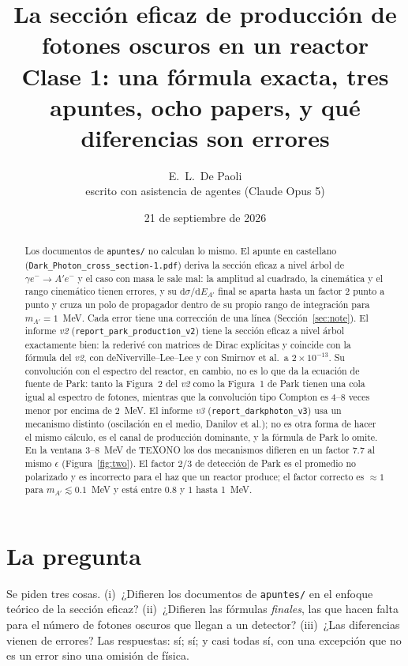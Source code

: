 \documentclass[11pt,a4paper]{article}
\title{La sección eficaz de producción de fotones oscuros en un reactor\\[2pt]
\large Clase 1: una fórmula exacta, tres apuntes, ocho papers, y qué diferencias son errores}
\author{E.~L.~De Paoli\\[2pt]\small escrito con asistencia de agentes (Claude Opus 5)}
\date{21 de septiembre de 2026}
\newcommand{\Ap}{A'}
\newcommand{\eps}{\epsilon}
\newcommand{\dd}{\mathrm{d}}
\begin{document}
\maketitle

\begin{abstract}
\noindent\sloppy
Los documentos de \texttt{apuntes/} no calculan lo mismo. El apunte en castellano
(\texttt{Dark\_Photon\_cross\_section-1.pdf}) deriva la sección eficaz a nivel árbol de $\gamma e^-\to \Ap e^-$ y el caso
con masa le sale mal: la amplitud al cuadrado, la cinemática y el rango cinemático tienen errores, y su
$\dd\sigma/\dd E_{\Ap}$ final se aparta hasta un factor 2 punto a punto y cruza un polo de propagador dentro de su propio
rango de integración para $m_{\Ap}=1$~MeV. Cada error tiene una corrección de una línea (Sección~\ref{sec:note}). El
informe \emph{v2} (\texttt{report\_park\_production\_v2}) tiene la sección eficaz a nivel árbol exactamente bien: la
rederivé con matrices de Dirac explícitas y coincide con la fórmula del \emph{v2}, con deNiverville--Lee--Lee y con
Smirnov et al.\ a $2\times10^{-13}$. Su convolución con el espectro del reactor, en cambio, no es lo que da la ecuación de
fuente de Park: tanto la Figura~2 del \emph{v2} como la Figura~1 de Park tienen una cola igual al espectro de fotones,
mientras que la convolución tipo Compton es 4--8 veces menor por encima de 2~MeV. El informe \emph{v3}
(\texttt{report\_darkphoton\_v3}) usa un mecanismo distinto (oscilación en el medio, Danilov et al.); no es otra forma de
hacer el mismo cálculo, es el canal de producción dominante, y la fórmula de Park lo omite. En la ventana 3--8~MeV de
TEXONO los dos mecanismos difieren en un factor $7.7$ al mismo $\eps$ (Figura~\ref{fig:two}). El factor $2/3$ de detección
de Park es el promedio no polarizado y es incorrecto para el haz que un reactor produce; el factor correcto es $\approx1$
para $m_{\Ap}\lesssim0.1$~MeV y está entre $0.8$ y $1$ hasta 1~MeV.
\end{abstract}

\section{La pregunta}
Se piden tres cosas. (i)~¿Difieren los documentos de \texttt{apuntes/} en el enfoque teórico de la sección eficaz?
(ii)~¿Difieren las fórmulas \emph{finales}, las que hacen falta para el número de fotones oscuros que llegan a un
detector? (iii)~¿Las diferencias vienen de errores? Las respuestas: sí; sí; y casi todas sí, con una excepción que no es
un error sino una omisión de física.
\end{document}
